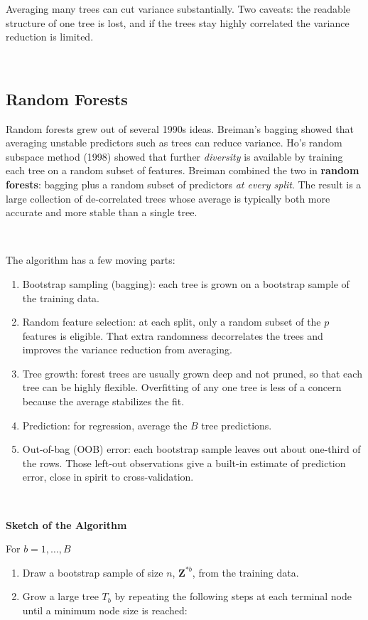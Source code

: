 \documentclass[
]{book}
\begin{document}
Averaging many trees can cut variance substantially. Two caveats: the readable structure of one tree is lost, and if the trees stay highly correlated the variance reduction is limited.

~~

\subsection{Random Forests}\label{random-forests}

Random forests grew out of several 1990s ideas. Breiman's bagging showed that averaging unstable predictors such as trees can reduce variance. Ho's random subspace method (1998) showed that further \emph{diversity} is available by training each tree on a random subset of features. Breiman combined the two in \textbf{random forests}: bagging plus a random subset of predictors \emph{at every split}. The result is a large collection of de-correlated trees whose average is typically both more accurate and more stable than a single tree.

~

The algorithm has a few moving parts:

\begin{enumerate}
\def\labelenumi{\arabic{enumi}.}
\item
  Bootstrap sampling (bagging): each tree is grown on a bootstrap sample of the training data.
\item
  Random feature selection: at each split, only a random subset of the \(p\) features is eligible. That extra randomness decorrelates the trees and improves the variance reduction from averaging.
\item
  Tree growth: forest trees are usually grown deep and not pruned, so that each tree can be highly flexible. Overfitting of any one tree is less of a concern because the average stabilizes the fit.
\item
  Prediction: for regression, average the \(B\) tree predictions.
\item
  Out-of-bag (OOB) error:
  each bootstrap sample leaves out about one-third of the rows. Those left-out observations give a built-in estimate of prediction error, close in spirit to cross-validation.
\end{enumerate}

~~

\textbf{Sketch of the Algorithm}

For \(b=1, \ldots, B\)

\begin{enumerate}
\def\labelenumi{\arabic{enumi}.}
\item
  Draw a bootstrap sample of size \(n\), \(\mathbf{Z}^{*b}\), from the training data.
\item
  Grow a large tree \(T_b\) by repeating the following steps at each terminal node until a minimum node size is reached:
\end{enumerate}
\end{document}
